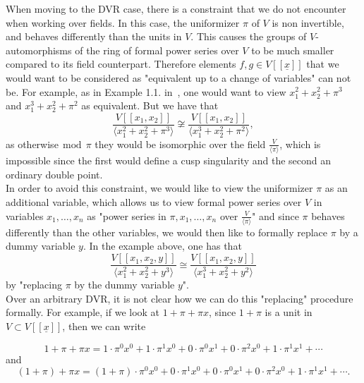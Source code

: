 \documentclass{article}
\numberwithin{theorem}{section}
\renewcommand{\mod}{\,\operatorname{mod}\,}
\begin{document}
When moving to the DVR case, there is a constraint that we do not encounter when working over fields. In this case,  the uniformizer $\pi$ of $V$ is non invertible, and behaves differently than the units in $V$. This causes the groups of $V$-automorphisms of the ring of formal power series over $V$ to be much smaller compared to its field counterpart. Therefore elements $f,g \in V[[\underline{x}]]$ that we would want to be considered as "equivalent up to a change of variables" can not be. For example, as in Example 1.1. in~\cite{carvajal2019covers}, one would want to view  $x_1^2 + x_2^2 + \pi^3$ and $x_1^3 + x_2^2 + \pi^2$ as equivalent.  But we have that
%
\begin{equation*}
    \frac{V[[x_1, x_2]]}{\langle x_1^2 + x_2^2 + \pi^3 \rangle} \not \cong \frac{V[[x_1, x_2]]}{\langle x_1^3 + x_2^2 + \pi^2 \rangle},
\end{equation*}
%
\noindent as otherwise$\mod \pi$ they would be isomorphic over the field $\frac{V}{\langle \pi \rangle}$, which is impossible since the first would define a cusp singularity and the second an ordinary double point.  \\

In order to avoid this constraint, we would like to view the uniformizer $\pi$ as an additional variable, which allows us to view formal power series over $V$ in variables $x_1, \dots, x_n$ as "power series in $\pi, x_1, \dots, x_n$ over $\frac{V}{\langle \pi \rangle}$" and since $\pi$ behaves differently than the other variables, we would then like to formally replace $\pi$ by a dummy variable $y$. In the example above, one has that
%
\begin{equation*}
    \frac{V[[x_1, x_2,y]]}{\langle x_1^2 + x_2^2 + y^3 \rangle} \cong \frac{V[[x_1, x_2,y]]}{\langle x_1^3 + x_2^2 + y^2 \rangle}
\end{equation*}
%
by "replacing $\pi$ by the dummy variable $y$".\\

Over an arbitrary DVR, it is not clear how we can do this "replacing" procedure formally. For example, if we look at $1+\pi + \pi x$, since $1+\pi$ is a unit in $V \subset V[[\underline{x}]]$, then we can write 
\begin{center}
\vspace{-10mm}
\begin{equation*}
    1+\pi + \pi x = 1\cdot \pi^0x^0 + 1 \cdot \pi^1 x^0 + 0 \cdot \pi^0x^1 + 0 \cdot \pi^2x^0 + 1\cdot \pi^1 x^1+ \cdots 
\end{equation*}
    and
    \begin{equation*}
    (1+\pi) + \pi x = (1+\pi)\cdot \pi^0x^0 + 0 \cdot \pi^1 x^0 + 0 \cdot \pi^0x^1 + 0 \cdot \pi^2x^0 + 1\cdot \pi^1 x^1 + \cdots.
\end{equation*}
\end{center}
\end{document}
